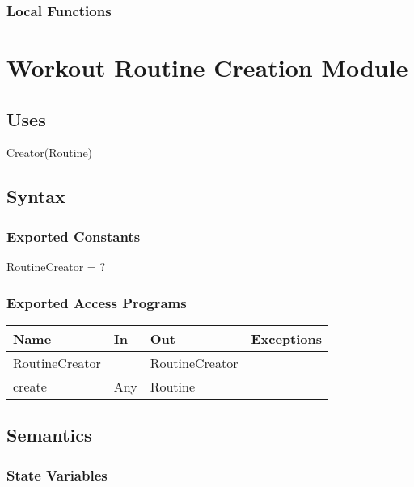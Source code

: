 \documentclass[12pt, titlepage]{article}
\begin{document}
\subsubsection{Local Functions}

\newpage

\section{Workout Routine Creation Module}

\subsection{Uses}

Creator(Routine)

\subsection{Syntax}

\subsubsection{Exported Constants}

RoutineCreator = ?

\subsubsection{Exported Access Programs}

\begin{center}
	\begin{tabular}{p{2cm} p{4cm} p{4cm} p{2cm}}
		\hline
		\textbf{Name} & \textbf{In} & \textbf{Out} & \textbf{Exceptions} \\
		\hline
		RoutineCreator &  & RoutineCreator &  \\
		create & Any & Routine &  \\
		\hline
	\end{tabular}
\end{center}

\subsection{Semantics}

\subsubsection{State Variables}
\end{document}
